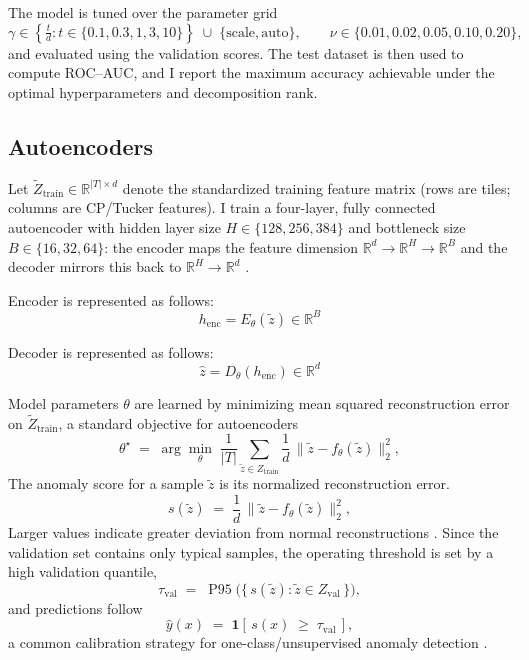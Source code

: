 \documentclass[pdflatex,sn-mathphys-ay]{sn-jnl}
\begin{document}
\noindent The model is tuned over the parameter grid \[
\gamma \in \left\{ \tfrac{t}{d} : t \in \{0.1, 0.3, 1, 3, 10\} \right\}
\;\cup\; \{\text{scale}, \text{auto}\}, \qquad
\nu \in \{0.01, 0.02, 0.05, 0.10, 0.20\},
\]
and evaluated using the validation scores. The test dataset is then used to compute ROC–AUC, and I report the maximum accuracy achievable under the optimal hyperparameters and decomposition rank.


\subsection{Autoencoders}

\noindent Let \(\tilde{Z}_{\text{train}}\in\mathbb{R}^{|T|\times d}\) denote the standardized training feature matrix (rows are tiles; columns are CP/Tucker features). I train a four-layer, fully connected autoencoder with hidden layer size \(H\in\{128,256,384\}\) and bottleneck size \(B\in\{16,32,64\}\): the encoder maps the feature dimension \(\mathbb{R}^{d}\!\to\!\mathbb{R}^{H}\!\to\!\mathbb{R}^{B}\) and the decoder mirrors this back to \(\mathbb{R}^{H}\!\to\!\mathbb{R}^{d}\) \citep{Hinton2006,Goodfellow2016}.

\noindent Encoder is represented as follows:
\[
h_{\text{enc}} = E_{\theta}(\tilde{z}) \in \mathbb{R}^{B}
\]

\noindent Decoder is represented as follows:
\[
\hat{z} = D_{\theta}(h_{\text{enc}}) \in \mathbb{R}^{d}
\]

\noindent Model parameters \(\theta\) are learned by minimizing mean squared reconstruction error on \(\tilde{Z}_{\text{train}}\), a standard objective for autoencoders \citep{Hinton2006,Goodfellow2016}
\[
\theta^{\star}
\;=\;
\arg\min_{\theta}\;
\frac{1}{|T|}\sum_{\tilde{z}\in Z_{\text{train}}}
\frac{1}{d}\,\big\lVert \tilde{z} - f_{\theta}(\tilde{z}) \big\rVert_{2}^{2},
\]
\noindent The anomaly score for a sample \(\tilde{z}\) is its normalized reconstruction error.
\[
s(\tilde{z})
\;=\;
\frac{1}{d}\,\big\lVert \tilde{z} - f_{\theta}(\tilde{z}) \big\rVert_{2}^{2},
\]
\noindent Larger values indicate greater deviation from normal reconstructions \citep{Sakurada2014,ZhouPaffenroth2017}. Since the validation set contains only typical samples, the operating threshold is set by a high validation quantile,
\[
\tau_{\text{val}} \;=\; \operatorname{P95}\!\big( \{\, s(\tilde{z}) : \tilde{z}\in Z_{\text{val}} \,\} \big),
\]
\noindent and predictions follow
\[
\hat{y}(x) \;=\; \mathbf{1}\!\left[\, s(x) \;\ge\; \tau_{\text{val}} \,\right],
\]
\noindent a common calibration strategy for one-class/unsupervised anomaly detection \citep{Chandola2009,Campos2016,Ruff2021}.
\end{document}
